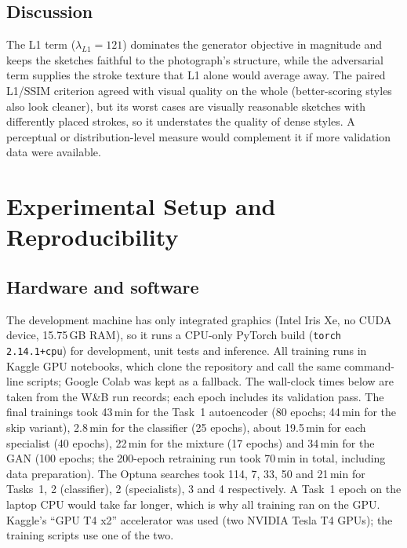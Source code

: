 \documentclass[conference]{IEEEtran}
\begin{document}
\subsection{Discussion}
The L1 term ($\lambda_{L1}=121$) dominates the generator objective in
magnitude and keeps the sketches faithful to the photograph's structure,
while the adversarial term supplies the stroke texture that L1 alone would
average away. The paired L1/SSIM criterion agreed with visual quality on the
whole (better-scoring styles also look cleaner), but its worst cases are
visually reasonable sketches with differently placed strokes, so it
understates the quality of dense styles. A perceptual or distribution-level
measure would complement it if more validation data were available.

\section{Experimental Setup and Reproducibility}
\label{sec:setup}

\subsection{Hardware and software}
The development machine has only integrated graphics (Intel Iris Xe, no CUDA
device, 15.75\,GB RAM), so it runs a CPU-only PyTorch build
(\texttt{torch 2.14.1+cpu}) for development, unit tests and inference. All
training runs in Kaggle GPU notebooks, which clone the repository and call
the same command-line scripts; Google Colab was kept as a fallback.
The wall-clock times below are taken from the W\&B run records; each epoch
includes its validation pass. The final trainings took 43\,min for the
Task~1 autoencoder (80 epochs; 44\,min for the skip variant), 2.8\,min for the
classifier (25 epochs), about 19.5\,min for each specialist (40 epochs),
22\,min for the mixture (17 epochs) and 34\,min for the GAN (100 epochs;
the 200-epoch retraining run took 70\,min in total, including data
preparation). The
Optuna searches took 114, 7, 33, 50 and 21\,min for Tasks~1, 2 (classifier),
2 (specialists), 3 and 4 respectively. A Task~1 epoch on the laptop CPU
would take far longer, which is why all training ran on the GPU.
Kaggle's ``GPU T4 x2'' accelerator was used (two NVIDIA Tesla T4 GPUs);
the training scripts use one of the two.
\end{document}
